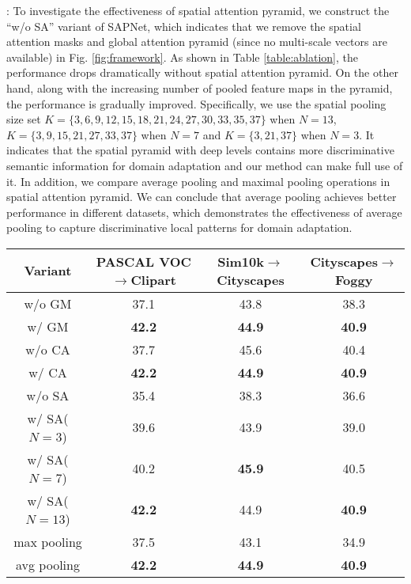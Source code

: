\documentclass[runningheads]{llncs}
\begin{document}
{:} To investigate the effectiveness of spatial attention pyramid, we construct the ``w/o SA'' variant of SAPNet, which indicates that we remove the spatial attention masks and global attention pyramid (since no multi-scale vectors are available) in Fig. \ref{fig:framework}. As shown in Table \ref{table:ablation}, the performance drops dramatically without spatial attention pyramid.  On the other hand, along with the increasing number of pooled feature maps in the pyramid, the performance is gradually improved. Specifically, we use the spatial pooling size set $K=\{3, 6, 9, 12, 15, 18, 21, 24, 27, 30, 33, 35, 37\}$ when $N=13$, $K=\{3, 9, 15, 21, 27, 33, 37\}$ when $N=7$ and $K=\{3, 21, 37\}$ when $N=3$. It indicates that the spatial pyramid with deep levels contains more discriminative semantic information for domain adaptation and our method can make full use of it. In addition, we compare average pooling and maximal pooling operations in spatial attention pyramid. We can conclude that average pooling achieves better performance in different datasets, which demonstrates the effectiveness of average pooling to capture discriminative local patterns for domain adaptation.
\begin{table*}[t]
\centering
\caption{Effectiveness of important aspects in SAPNet.}
\label{table:ablation}
\setlength{\tabcolsep}{3.5pt}
\begin{tabular}{c|c|c|c}
\hline
Variant & PASCAL VOC$\to$Clipart & Sim10k$\to$Cityscapes & Cityscapes$\to$Foggy \\
\hline
w/o GM &37.1 &43.8 &38.3  \\
w/ GM   &\bf42.2 &\bf44.9 &\bf40.9  \\
\hline\hline
w/o CA & 37.7 & 45.6 & 40.4 \\
w/ CA   & \bf42.2 & \bf44.9 & \bf40.9  \\
\hline\hline
w/o SA & 35.4 & 38.3 & 36.6  \\
w/ SA($N=3$)  & 39.6 & 43.9 & 39.0 \\
w/ SA($N=7$)  & 40.2 & \bf45.9 & 40.5 \\
w/ SA($N=13$) & \bf42.2 & 44.9 & \bf40.9 \\
\hline\hline
max pooling & 37.5 & 43.1 & 34.9 \\
avg pooling & \bf42.2 & \bf44.9 & \bf40.9 \\
\hline
\end{tabular}
\end{table*}
\end{document}

